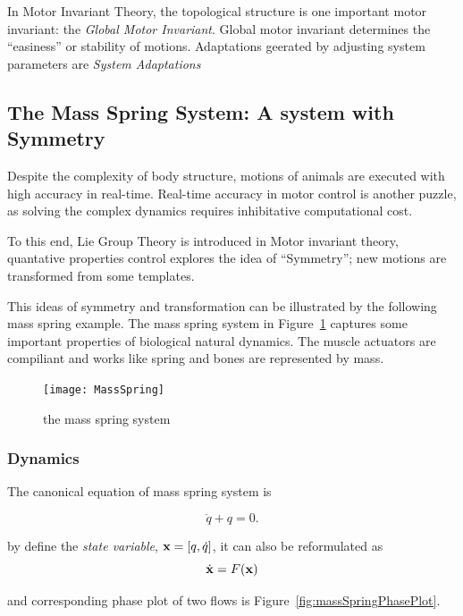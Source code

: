 In Motor Invariant Theory, the topological structure is one important motor invariant: the \emph{Global Motor Invariant}.
Global motor invariant determines the ``easiness'' or stability of motions.
Adaptations geerated by adjusting system parameters are \emph{System Adaptations}


\subsection{The Mass Spring System: A system with Symmetry}
Despite the complexity of body structure, motions of animals are executed with high accuracy in real-time.
Real-time accuracy in motor control is another puzzle, as solving the complex dynamics requires inhibitative computational cost.

To this end, Lie Group Theory is introduced in Motor invariant theory, 
quantative properties control explores the idea of ``Symmetry''; new motions are transformed from some templates.

This ideas of symmetry and transformation  can be illustrated by the following mass spring example.
The mass spring system in Figure~\ref{fig:massspring} captures some important properties of biological natural dynamics.
The muscle actuators are compiliant and works like spring and  bones are represented by mass.

\begin{figure}[!htbp]
  \begin{center}
    \texttt{[image: MassSpring]}
    \caption{the mass spring system}
    \label{fig:massspring}
  \end{center}
\end{figure}

\subsubsection*{Dynamics}




The canonical equation of mass spring system is

\begin{equation}
\label{eq:mass-spring}
\ddot{q}+q=0.
\end{equation}

by define the \emph{state variable}, $\mathbf{x}=[q,\dot{q}]$, it can also be reformulated as
\[
\dot{\mathbf{x}}=F(\mathbf{x})
\]

and corresponding phase plot of two flows is Figure~\ref{fig:massSpringPhasePlot}.


